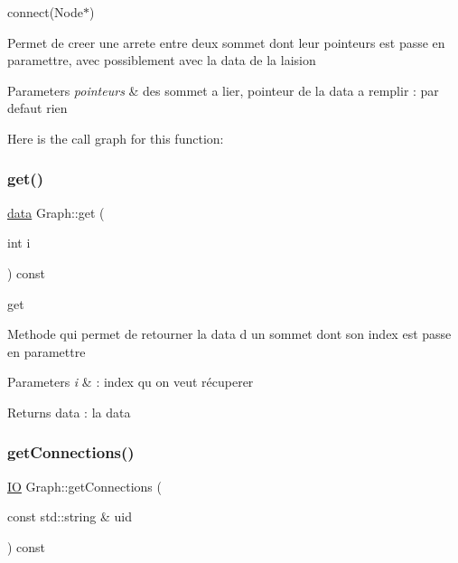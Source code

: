 connect(\+Node$\ast$) 

Permet de creer une arrete entre deux sommet dont leur pointeurs est passe en paramettre, avec possiblement avec la data de la laision


\begin{DoxyParams}{Parameters}
{\em pointeurs} & des sommet a lier, pointeur de la data a remplir \+: par defaut rien \\
\hline
\end{DoxyParams}
Here is the call graph for this function\+:
\mbox{\label{class_graph_a78762961b8cf256a828c80cb7ec26021}} 
\subsubsection{\texorpdfstring{get()}{get()}}
{\footnotesize\ttfamily \mbox{\hyperlink{_graph_8h_a98cbe1f79429fc62806b32b6e8871d9e}{data}} Graph\+::get (\begin{DoxyParamCaption}\item[{int}]{i }\end{DoxyParamCaption}) const}



get 

Methode qui permet de retourner la data d un sommet dont son index est passe en paramettre


\begin{DoxyParams}{Parameters}
{\em i} & \+: index qu on veut récuperer \\
\hline
\end{DoxyParams}
\begin{DoxyReturn}{Returns}
data \+: la data 
\end{DoxyReturn}
\mbox{\label{class_graph_a163656854e289f8dbdf037683d581dec}} 
\subsubsection{\texorpdfstring{get\+Connections()}{getConnections()}\hspace{0.1cm}{\footnotesize\ttfamily [1/2]}}
{\footnotesize\ttfamily \mbox{\hyperlink{_graph_8h_a383232190011cffd7d1fb05d72e89928}{IO}} Graph\+::get\+Connections (\begin{DoxyParamCaption}\item[{const std\+::string \&}]{uid }\end{DoxyParamCaption}) const}



